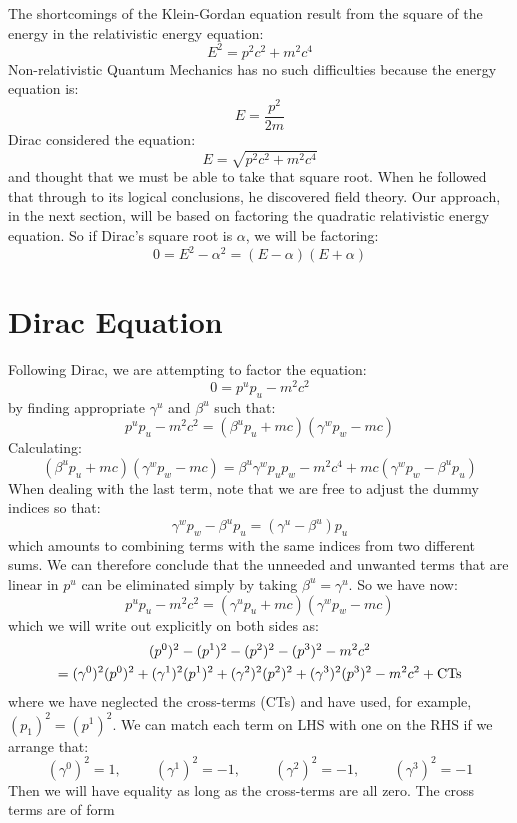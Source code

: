 \documentclass[12pt]{book}
\begin{document}
The shortcomings of the Klein-Gordan equation result from the square of the energy in the relativistic energy equation:
$$E^2 = p^2c^2 + m^2c^4$$
Non-relativistic Quantum Mechanics has no such difficulties because the energy equation is:
$$E = \frac{p^2}{2m}$$
Dirac considered the equation:
$$E = \sqrt{p^2c^2 + m^2c^4}$$
and thought that we must be able to take that square root.  When he followed that through to its logical conclusions, he discovered field theory.  Our approach, in the next section, will be based on factoring the quadratic relativistic energy equation.  So if Dirac's square root is $\alpha$, we will be factoring:
$$0 = E^2 - \alpha^2 = (E-\alpha)(E+\alpha)$$

\section{Dirac Equation}
Following Dirac, we are attempting to factor the equation:
$$0 = p^u p_u - m^2 c^2$$
by finding appropriate $\gamma^u$ and $\beta^u$ such that:
$$p^u p_u - m^2 c^2 = (\beta^u p_u + mc) (\gamma^w p_w - mc)$$
Calculating:
$$(\beta^u p_u + mc) (\gamma^w p_w - mc) 
= \beta^u \gamma^w p_u p_w - m^2c^4 + mc (\gamma^w p_w - \beta^u p_u)$$
When dealing with the last term, note that we are free to adjust the dummy indices so that:
$$\gamma^w p_w - \beta^u p_u = (\gamma^u - \beta^u) p_u$$
which amounts to combining terms with the same indices from two different sums.  We can therefore conclude that the unneeded and unwanted terms that are linear in $p^u$ can be eliminated simply by taking $\beta^u = \gamma^u$.  So we have now:
$$p^u p_u - m^2 c^2 = (\gamma^u p_u + mc) (\gamma^w p_w - mc)$$
which we will write out explicitly on both sides as:
\begin{multline*}
(p^0)^2-(p^1)^2-(p^2)^2-(p^3)^2-m^2c^2 \\
= (\gamma^0)^2 (p^0)^2 + (\gamma^1)^2 (p^1)^2 + (\gamma^2)^2 (p^2)^2 + (\gamma^3)^2 (p^3)^2
-m^2c^2 + {\rm CTs}
\end{multline*}
where we have neglected the cross-terms (CTs) and have used, for example, $(p_1)^2=(p^1)^2$.  We can match each term on LHS with one on the RHS if we arrange that:
\begin{equation}
\label{eqn:gammasq}
(\gamma^0)^2=1, \hspace{1cm} (\gamma^1)^2=-1,  \hspace{1cm} (\gamma^2)^2=-1,
 \hspace{1cm} (\gamma^3)^2=-1
\end{equation}
Then we will have equality as long as the cross-terms are all zero.  The cross terms are of form
\end{document}
